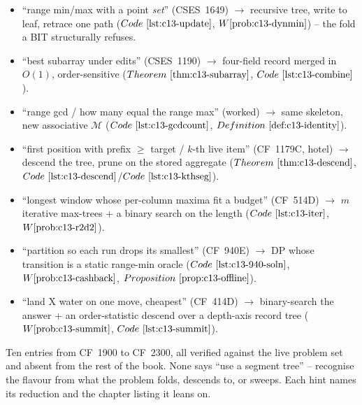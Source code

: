 \begin{itemize}[nosep, leftmargin=1.4em]
  \item ``range min/max with a point \emph{set}'' (CSES~1649) \(\to\) recursive
        tree, write to leaf, retrace one path (\(\coderef{c13-update}\),
        \(\probref{c13-dynmin}\)) -- the fold a BIT structurally refuses.
  \item ``best subarray under edits'' (CSES~1190) \(\to\) four-field record merged
        in \(O(1)\), order-sensitive (\(\thmref{c13-subarray}\), \(\coderef{c13-combine}\)).
  \item ``range gcd / how many equal the range max'' (worked) \(\to\) same skeleton,
        new associative \(\mathcal{M}\) (\(\coderef{c13-gcdcount}\), \(\defref{c13-identity}\)).
  \item ``first position with prefix \(\ge\) target / \(k\)-th live item'' (CF~1179C,
        hotel) \(\to\) descend the tree, prune on the stored aggregate
        (\(\thmref{c13-descend}\), \(\coderef{c13-descend}\)/\(\coderef{c13-kthseg}\)).
  \item ``longest window whose per-column maxima fit a budget'' (CF~514D) \(\to\)
        \(m\) iterative max-trees + a binary search on the length
        (\(\coderef{c13-iter}\), \(\probref{c13-r2d2}\)).
  \item ``partition so each run drops its smallest'' (CF~940E) \(\to\) DP whose
        transition is a static range-min oracle (\(\coderef{c13-940-soln}\),
        \(\probref{c13-cashback}\), \(\propref{c13-offline}\)).
  \item ``land X water on one move, cheapest'' (CF~414D) \(\to\) binary-search the
        answer + an order-statistic descend over a depth-axis record tree
        (\(\probref{c13-summit}\), \(\coderef{c13-summit}\)).
\end{itemize}


Ten entries from CF~1900 to CF~2300, all verified against the live problem set
and absent from the rest of the book. None says ``use a segment tree'' --
recognise the flavour from what the problem folds, descends to, or sweeps. Each
hint names its reduction and the chapter listing it leans on.


